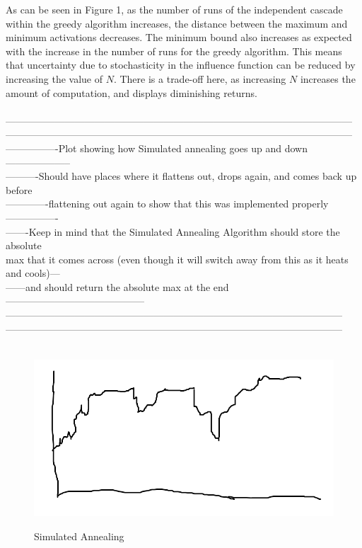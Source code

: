 \documentclass[11pt]{scrartcl} %
\begin{document}
\begin{enumerate}
As can be seen in Figure 1, as the number of runs of the independent cascade within the greedy algorithm increases, the distance between the maximum and minimum activations decreases. The minimum bound also increases as expected with the increase in the number of runs for the greedy algorithm.  This means that uncertainty due to stochasticity in the influence function can be reduced by increasing the value of $N$.  There is a trade-off here, as increasing $N$ increases the amount of computation, and displays diminishing returns.  
\\
\\
---------------------------------------------------------------------------------------------------------\\
---------------------------------------------------------------------------------------------------------\\
----------------Plot showing how Simulated annealing goes up and down--------------------\\
----------Should have places where it flattens out, drops again, and comes back up before\\
-------------flattening out again to show that this was implemented properly----------------\\
-------Keep in mind that the Simulated Annealing Algorithm should store the absolute \\
max that it comes across (even though it will switch away from this as it heats and cools)---\\
------and should return the absolute max at the end------------------------------------------\\
------------------------------------------------------------------------------------------------------\\
------------------------------------------------------------------------------------------------------\\
\\
\begin{figure}
\centering
\includegraphics[width=10 cm]{SimAnFake}
\label{fig_sim}
\caption{Simulated Annealing}
\label{fig:LR}
\end{figure}


\end{enumerate}
\end{document}
